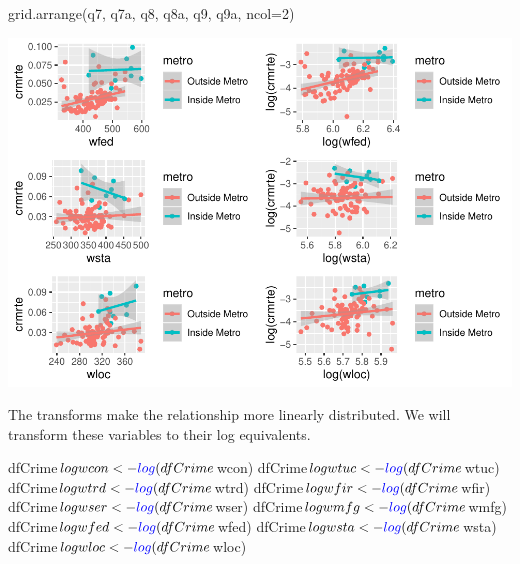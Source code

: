 \documentclass[]{article}
\newenvironment{Shaded}{}{}
\newcommand{\DataTypeTok}[1]{#1}
\newcommand{\DecValTok}[1]{#1}
\newcommand{\KeywordTok}[1]{\textcolor[rgb]{0.00,0.00,1.00}{#1}}
\newcommand{\NormalTok}[1]{#1}
\newcommand{\OperatorTok}[1]{#1}
\begin{document}
\begin{Shaded}
\begin{Highlighting}[]
\KeywordTok{grid.arrange}\NormalTok{(q7, q7a, q8, q8a, q9, q9a, }\DataTypeTok{ncol=}\DecValTok{2}\NormalTok{)}
\end{Highlighting}
\end{Shaded}

\includegraphics{Bagnard_Gaustad_Hartman_Leung_Lab_3_files/figure-latex/unnamed-chunk-92-3.pdf}

The transforms make the relationship more linearly distributed. We will
transform these variables to their log equivalents.

\begin{Shaded}
\begin{Highlighting}[]
\NormalTok{dfCrime}\OperatorTok{$}\NormalTok{logwcon<-}\KeywordTok{log}\NormalTok{(dfCrime}\OperatorTok{$}\NormalTok{wcon)}
\NormalTok{dfCrime}\OperatorTok{$}\NormalTok{logwtuc<-}\KeywordTok{log}\NormalTok{(dfCrime}\OperatorTok{$}\NormalTok{wtuc)}
\NormalTok{dfCrime}\OperatorTok{$}\NormalTok{logwtrd<-}\KeywordTok{log}\NormalTok{(dfCrime}\OperatorTok{$}\NormalTok{wtrd)}
\NormalTok{dfCrime}\OperatorTok{$}\NormalTok{logwfir<-}\KeywordTok{log}\NormalTok{(dfCrime}\OperatorTok{$}\NormalTok{wfir)}
\NormalTok{dfCrime}\OperatorTok{$}\NormalTok{logwser<-}\KeywordTok{log}\NormalTok{(dfCrime}\OperatorTok{$}\NormalTok{wser)}
\NormalTok{dfCrime}\OperatorTok{$}\NormalTok{logwmfg<-}\KeywordTok{log}\NormalTok{(dfCrime}\OperatorTok{$}\NormalTok{wmfg)}
\NormalTok{dfCrime}\OperatorTok{$}\NormalTok{logwfed<-}\KeywordTok{log}\NormalTok{(dfCrime}\OperatorTok{$}\NormalTok{wfed)}
\NormalTok{dfCrime}\OperatorTok{$}\NormalTok{logwsta<-}\KeywordTok{log}\NormalTok{(dfCrime}\OperatorTok{$}\NormalTok{wsta)}
\NormalTok{dfCrime}\OperatorTok{$}\NormalTok{logwloc<-}\KeywordTok{log}\NormalTok{(dfCrime}\OperatorTok{$}\NormalTok{wloc)}
\end{Highlighting}
\end{Shaded}
\end{document}
